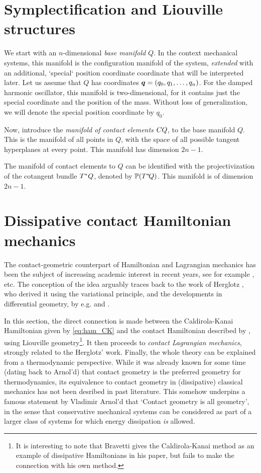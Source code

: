 \section{Symplectification and Liouville structures}
We start with an $n$-dimensional \emph{base manifold} $Q$. In the context mechanical systems, this manifold is the configuration manifold of the system, \emph{extended} with an additional, `special` position coordinate coordinate that will be interpreted later. Let us assume that $Q$ has coordinates $\vec{q} = \qty(q_0, q_1, \ldots, q_n)$. For the damped harmonic oscillator, this manifold is two-dimensional, for it contains just the special coordinate and the position of the mass. Without loss of generalization, we will denote the special position coordinate by $q_0$.

Now, introduce the \emph{manifold of contact elements} $CQ$, to the base manifold $Q$. This is the manifold of all points in $Q$, with the space of all possible tangent hyperplanes at every point. This manifold has dimension $2n-1$.

The manifold of contact elements to $Q$ can be identified with the projectivization of the cotangent bundle $T^*Q$, denoted by $\mathbb{P}\qty(T^*\!Q)$. This manifold is of dimension $2n-1$. 

\section{Dissipative contact Hamiltonian mechanics}
The contact-geometric counterpart of Hamiltonian and Lagrangian mechanics has been the subject of increasing academic interest in recent years, see for example \citet{VanderSchaft2021a,VanderSchaft2018,Maschke2018,Bravetti2017,DeLeon2020}, etc. The conception of the idea arguably traces back to the work of Herglotz \cite{Guenther1996}, who derived it using the variational principle, and the developments in differential geometry, by e.g. \citet{Arnold1989} and \citet{Libermann1987}.

In this section, the direct connection is made between the Caldirola-Kanai Hamiltonian given by \cref{eq:ham_CK} and the contact Hamiltonian described by \citet{Bravetti2017}, using Liouville geometry\footnote{It is interesting to note that Bravetti gives the Caldirola-Kanai method as an example of dissipative Hamiltonians in his paper, but fails to make the connection with his own method.}. It then proceeds to \emph{contact Lagrangian mechanics}, strongly related to the Herglotz' work. Finally, the whole theory can be explained from a thermodynamic perspective. While it was already known for some time (dating back to Arnol'd) that contact geometry is the preferred geometry for thermodynamics, its equivalence to contact geometry in (dissipative) classical mechanics has not been desribed in past literature. This somehow underpins a famous statement by Vladimir Arnol'd that `Contact geometry is all geometry', in the sense that conservative mechanical systems can be considered as part of a larger class of systems for which energy dissipation \emph{is} allowed. \cite{Geiges2008}

